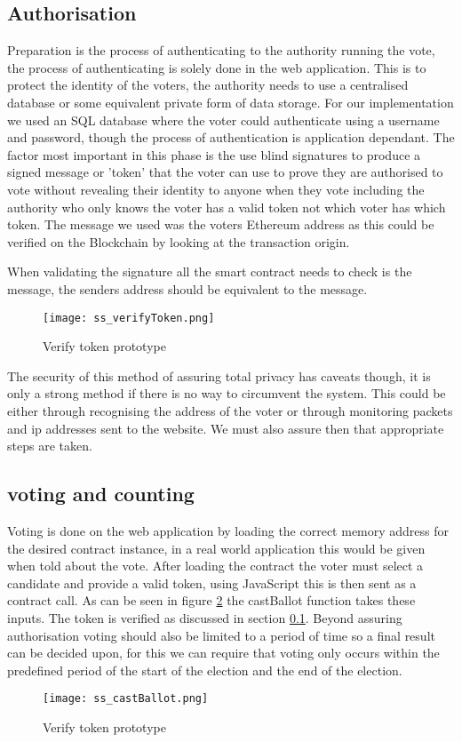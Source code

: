 \documentclass{entcs}
\begin{document}
\subsection{Authorisation}\label{sec: Auth}
Preparation is the process of authenticating to the authority running the vote, the process of authenticating is solely done in the web application. This is to protect the identity of the voters, the authority needs to use a centralised database or some equivalent private form of data storage. For our implementation we used an SQL database where the voter could authenticate using a username and password, though the process of authentication is application dependant. The factor most important in this phase is the use blind signatures to produce a signed message or 'token' that the voter can use to prove they are authorised to vote without revealing their identity to anyone when they vote including the authority who only knows the voter has a valid token not which voter has which token. The message we used was the voters Ethereum address as this could be verified on the Blockchain by looking at the transaction origin.

When validating the signature all the smart contract needs to check is the message, the senders address should be equivalent to the message.
\begin{figure}[h!]
    \centering
    \texttt{[image: ss\_verifyToken.png]}
    \caption{Verify token prototype}
    \label{fig:verifyToken}
\end{figure}
The security of this method of assuring total privacy has caveats though, it is only a strong method if there is no way to circumvent the system. This could be either through recognising the address of the voter or through monitoring packets and ip addresses sent to the website. We must also assure then that appropriate steps are taken.

\subsection{voting and counting}
Voting is done on the web application by loading the correct memory address for the desired contract instance, in a real world application this would be given when told about the vote. After loading the contract the voter must select a candidate and provide a valid token, using JavaScript this is then sent as a contract call. As can be seen in figure \ref{fig:castBallot} the castBallot function takes these inputs. The token is verified as discussed in section \ref{sec: Auth}. 
Beyond assuring authorisation voting should also be limited to a period of time so a final result can be decided upon, for this we can require that voting only occurs within the predefined period of the start of the election and the end of the election.
\begin{figure}[h!]
    \centering
    \texttt{[image: ss\_castBallot.png]}
    \caption{Verify token prototype}
    \label{fig:castBallot}
\end{figure}
\end{document}

